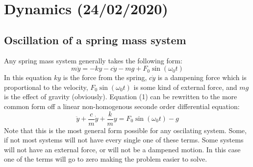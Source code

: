 \documentclass[11pt, a4paper]{article}
\begin{document}
\setcounter{section}{4}

\section{Dynamics (24/02/2020)}
\subsection{Oscillation of a spring mass system}
Any spring mass system generally takes the following form:
\begin{equation}
  m\ddot{y} = -ky - c\dot{y} - mg + F_0\sin(\omega_0t)
\end{equation}
In this equation $ky$ is the force from the spring, $c\dot{y}$ is a dampening force which is proportional
to the velocity, $F_0\sin(\omega_0t)$ is some kind of external force, and $mg$ is the effect of gravity (obviously).
Equation (1) can be rewritten to the more common form off a linear non-homogenous seconde order differential
equation:
\begin{equation}
  \ddot{y} + \frac{c}{m}\dot{y} + \frac{k}{m}y = F_0\sin(\omega_0t) - g
\end{equation}
Note that this is the most general form possible for any oscilating system. Some, if not most systems
will not have every single one of these terms. Some systems will not have an external force, or will not
be a dampened motion. In this case one of the terms will go to zero making the problem easier to solve.

\setcounter{equation}{0}
\end{document}
